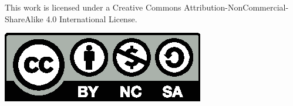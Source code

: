 \begin{minipage}{0.7\textwidth}
\begin{center}
This work is licensed under a Creative Commons Attribution-NonCommercial-ShareAlike 4.0 International License.

\includegraphics[scale=0.7]{src/ring/gfx/by-nc-sa.eps}
\end{center}
\end{minipage}
